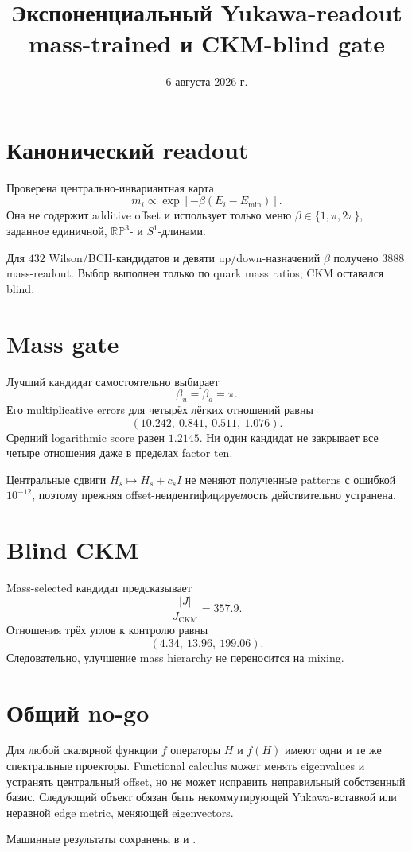 \documentclass[12pt,a4paper]{article}
\title{Экспоненциальный Yukawa-readout\\
mass-trained и CKM-blind gate}
\author{}
\date{6 августа 2026 г.}
\begin{document}
\maketitle

\section{Канонический readout}

Проверена центрально-инвариантная карта
\[
 m_i\propto\exp[-\beta(E_i-E_{\min})].
\]
Она не содержит additive offset и использует только меню
\(\beta\in\{1,\pi,2\pi\}\), заданное единичной, \(\mathbb{RP}^3\)- и
\(S^1\)-длинами.

Для \(432\) Wilson/BCH-кандидатов и девяти up/down-назначений \(\beta\)
получено \(3888\) mass-readout. Выбор выполнен только по quark mass ratios;
CKM оставался blind.

\section{Mass gate}

Лучший кандидат самостоятельно выбирает
\[
 \beta_u=\beta_d=\pi.
\]
Его multiplicative errors для четырёх лёгких отношений равны
\[
 (10.242,\ 0.841,\ 0.511,\ 1.076).
\]
Средний logarithmic score равен \(1.2145\). Ни один кандидат не закрывает все
четыре отношения даже в пределах factor ten.

Центральные сдвиги \(H_s\mapsto H_s+c_sI\) не меняют полученные patterns с
ошибкой \(10^{-12}\), поэтому прежняя offset-неидентифицируемость действительно
устранена.

\section{Blind CKM}

Mass-selected кандидат предсказывает
\[
 \frac{|J|}{J_{\mathrm{CKM}}}=357.9.
\]
Отношения трёх углов к контролю равны
\[
 (4.34,\ 13.96,\ 199.06).
\]
Следовательно, улучшение mass hierarchy не переносится на mixing.

\section{Общий no-go}

Для любой скалярной функции \(f\) операторы \(H\) и \(f(H)\) имеют одни и те
же спектральные проекторы. Functional calculus может менять eigenvalues и
устранять центральный offset, но не может исправить неправильный собственный
базис. Следующий объект обязан быть некоммутирующей Yukawa-вставкой или
неравной edge metric, меняющей eigenvectors.

Машинные результаты сохранены в
 и
.
\end{document}

